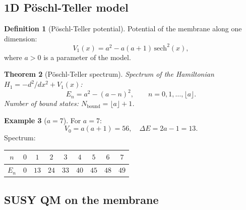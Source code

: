 \documentclass[11pt,a4paper]{article}
\newtheorem{theorem}{Theorem}[section]
\theoremstyle{definition}
\newtheorem{definition}[theorem]{Definition}
\newtheorem{example}[theorem]{Example}
\begin{document}
\subsection{1D Pöschl-Teller model}

\begin{definition}[Pöschl-Teller potential]
\label{def:membrane-pt-review}
Potential of the membrane along one dimension:
\begin{equation}
    \boxed{
    V_1(x) = a^2 - a(a+1) \, \mathrm{sech}^2(x),
    }
    \label{eq:membrane-V1-review}
\end{equation}
where $a > 0$ is a parameter of the model.
\end{definition}

\begin{theorem}[Pöschl-Teller spectrum]
\label{thm:membrane-spectrum-review}
Spectrum of the Hamiltonian $H_1 = -d^2/dx^2 + V_1(x)$:
\begin{equation}
    \boxed{
    E_n = a^2 - (a - n)^2, \qquad n = 0, 1, \ldots, \lfloor a \rfloor.
    }
    \label{eq:membrane-spectrum-review}
\end{equation}
Number of bound states: $N_{\text{bound}} = \lfloor a \rfloor + 1$.
\end{theorem}

\begin{example}[$a = 7$]
For $a = 7$:
\begin{equation}
    V_0 = a(a+1) = 56, \quad \Delta E = 2a - 1 = 13.
\end{equation}
Spectrum:
\begin{center}
\begin{tabular}{c|cccccccc}
\toprule
$n$ & $0$ & $1$ & $2$ & $3$ & $4$ & $5$ & $6$ & $7$ \\
\midrule
$E_n$ & $0$ & $13$ & $24$ & $33$ & $40$ & $45$ & $48$ & $49$ \\
\bottomrule
\end{tabular}
\end{center}
\end{example}

\subsection{SUSY QM on the membrane}
\end{document}
